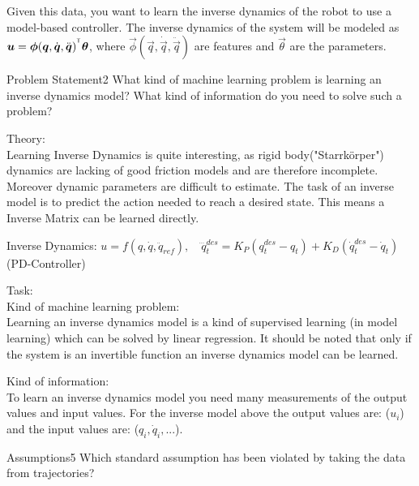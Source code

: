 Given this data, you want to learn the inverse dynamics of the robot to use a model-based controller.
The inverse dynamics of the system will be modeled as ${\boldsymbol{u}}={\boldsymbol{\phi}}({\boldsymbol{q}},\dot{{\boldsymbol{q}}},\ddot{{\boldsymbol{q}}})^{^\mathsf{T}}{\boldsymbol{\theta}}$, where $\vec{\phi}(\vec{q},\dot{\vec{q}},\ddot{\vec{q}})$ are features and $\vec{\theta}$ are the parameters.

\begin{questions}


\begin{question}{Problem Statement}{2}
What kind of machine learning problem is learning an inverse dynamics model? What kind of information do you need to solve such a problem?

\begin{answer}
	Theory:\\
	Learning Inverse Dynamics is quite interesting, as rigid body("Starrk\"orper") dynamics are lacking of good friction models and are therefore incomplete. Moreover dynamic parameters are difficult to estimate. The task of an inverse model is to predict the action needed to reach a desired state. This means a Inverse Matrix can be learned directly.
	
	Inverse Dynamics: $u=f(q,\dot{q},\ddot{q}_{ref}), \quad \dddot{q}_t^{des}=K_P(q_t^{des}-q_t)+K_D(\dot{q}_t^{des}-\dot{q}_t)$ (PD-Controller)
	
	Task:\\
	Kind of machine learning problem:\\
	Learning an inverse dynamics model is a kind of supervised learning (in model learning) which can be solved by linear regression. It should be noted that only if the system is an invertible function an inverse dynamics model can be learned.

	
	Kind of information:\\
	To learn an inverse dynamics model you need many measurements of the output values and input values. For the inverse model above the output values are: ($u_i$) and the input values are: ($q_i, \dot{q}_i,...$).


	\end{answer}

\end{question}



\begin{question}{Assumptions}{5}
Which standard assumption has been violated by taking the data from trajectories?


\end{question}
\end{questions}
